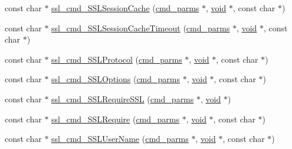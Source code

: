 \begin{DoxyCompactItemize}
\item 
const char $\ast$ \hyperlink{group__MOD__SSL__PRIVATE_gab977447a91234c86f116a6958da8ab34}{ssl\+\_\+cmd\+\_\+\+S\+S\+L\+Session\+Cache} (\hyperlink{group__APACHE__CORE__CONFIG_ga1791fbd28d06a9847bad001541c5241e}{cmd\+\_\+parms} $\ast$, \hyperlink{group__MOD__ISAPI_gacd6cdbf73df3d9eed42fa493d9b621a6}{void} $\ast$, const char $\ast$)
\item 
const char $\ast$ \hyperlink{group__MOD__SSL__PRIVATE_ga0814f5be34952db55da30f90fba63cfc}{ssl\+\_\+cmd\+\_\+\+S\+S\+L\+Session\+Cache\+Timeout} (\hyperlink{group__APACHE__CORE__CONFIG_ga1791fbd28d06a9847bad001541c5241e}{cmd\+\_\+parms} $\ast$, \hyperlink{group__MOD__ISAPI_gacd6cdbf73df3d9eed42fa493d9b621a6}{void} $\ast$, const char $\ast$)
\item 
const char $\ast$ \hyperlink{group__MOD__SSL__PRIVATE_ga3d73a1f70f5c721aaa5c7668578aeff5}{ssl\+\_\+cmd\+\_\+\+S\+S\+L\+Protocol} (\hyperlink{group__APACHE__CORE__CONFIG_ga1791fbd28d06a9847bad001541c5241e}{cmd\+\_\+parms} $\ast$, \hyperlink{group__MOD__ISAPI_gacd6cdbf73df3d9eed42fa493d9b621a6}{void} $\ast$, const char $\ast$)
\item 
const char $\ast$ \hyperlink{group__MOD__SSL__PRIVATE_gada7401ec64413cbf68b485094276b59e}{ssl\+\_\+cmd\+\_\+\+S\+S\+L\+Options} (\hyperlink{group__APACHE__CORE__CONFIG_ga1791fbd28d06a9847bad001541c5241e}{cmd\+\_\+parms} $\ast$, \hyperlink{group__MOD__ISAPI_gacd6cdbf73df3d9eed42fa493d9b621a6}{void} $\ast$, const char $\ast$)
\item 
const char $\ast$ \hyperlink{group__MOD__SSL__PRIVATE_gab90543b8540d697239a6b993d41459fc}{ssl\+\_\+cmd\+\_\+\+S\+S\+L\+Require\+S\+SL} (\hyperlink{group__APACHE__CORE__CONFIG_ga1791fbd28d06a9847bad001541c5241e}{cmd\+\_\+parms} $\ast$, \hyperlink{group__MOD__ISAPI_gacd6cdbf73df3d9eed42fa493d9b621a6}{void} $\ast$)
\item 
const char $\ast$ \hyperlink{group__MOD__SSL__PRIVATE_ga96d1a8b44a1728954993558a3cb1c342}{ssl\+\_\+cmd\+\_\+\+S\+S\+L\+Require} (\hyperlink{group__APACHE__CORE__CONFIG_ga1791fbd28d06a9847bad001541c5241e}{cmd\+\_\+parms} $\ast$, \hyperlink{group__MOD__ISAPI_gacd6cdbf73df3d9eed42fa493d9b621a6}{void} $\ast$, const char $\ast$)
\item 
const char $\ast$ \hyperlink{group__MOD__SSL__PRIVATE_ga6c485fc03af997bfc0d39bca87ba853a}{ssl\+\_\+cmd\+\_\+\+S\+S\+L\+User\+Name} (\hyperlink{group__APACHE__CORE__CONFIG_ga1791fbd28d06a9847bad001541c5241e}{cmd\+\_\+parms} $\ast$, \hyperlink{group__MOD__ISAPI_gacd6cdbf73df3d9eed42fa493d9b621a6}{void} $\ast$, const char $\ast$)

\end{DoxyCompactItemize}
